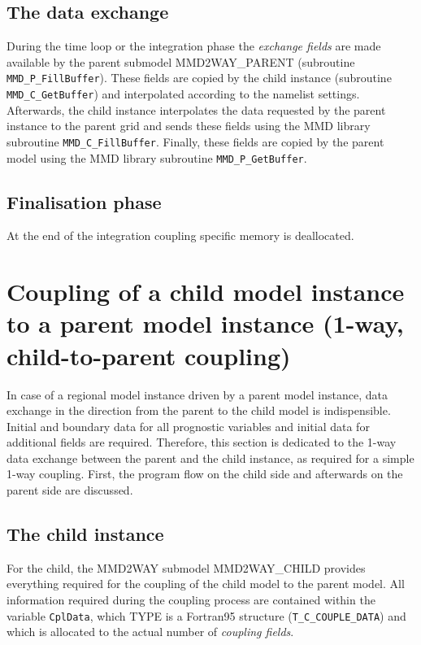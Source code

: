 \documentclass[11pt,twoside]{article}
\begin{document}
\subsection{\bf The data exchange}
 During the time loop or the integration phase the {\it exchange fields}
are made available by the parent submodel MMD2WAY\_PARENT (subroutine 
\verb|MMD_P_FillBuffer|). These fields are copied by the child instance
(subroutine \verb|MMD_C_GetBuffer|) and interpolated according to the namelist
settings. 
 Afterwards, the child instance interpolates the data requested by the parent
instance to the parent grid and sends these fields using the MMD library
 subroutine \verb|MMD_C_FillBuffer|. 
Finally, these fields are copied by the parent model using the MMD library
subroutine \verb|MMD_P_GetBuffer|. 

\subsection{\bf Finalisation phase\label{subFinPhase}}
 At the end of the integration coupling specific memory is deallocated.


\section{Coupling of a child model instance to a parent model instance
(1-way, child-to-parent coupling) \label{sec:c2p}}
In case of a regional model instance driven by a parent model
instance, data exchange in the 
direction from the parent to the child model is indispensible.
Initial and boundary data for all prognostic variables and initial data for
additional fields are required. Therefore, this section is dedicated to the
1-way data exchange between the parent and the child instance, as required for a
simple 1-way coupling. First, the program flow on the child side and
afterwards on the parent side are discussed.

\subsection{The child instance}\label{sec:Client}

For the child, the MMD2WAY submodel MMD2WAY\_CHILD provides everything
required for the coupling of the child model to the parent model.
All information required during the coupling process are contained within the
variable \verb|CplData|, which {\footnotesize TYPE} is a Fortran95 structure 
(\verb|T_C_COUPLE_DATA|) and which is allocated to the actual number of 
{\it coupling fields}.
\end{document}
